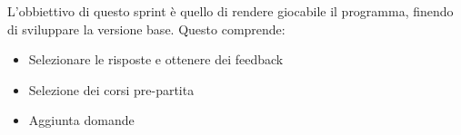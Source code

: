 L'obbiettivo di questo sprint è quello di rendere giocabile il programma, finendo di sviluppare la versione base. Questo comprende:
\begin{itemize}
    \item Selezionare le risposte e ottenere dei feedback
    \item Selezione dei corsi pre-partita
    \item Aggiunta domande
\end{itemize} 
